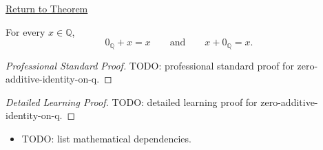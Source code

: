 \newpage
{}
\label{prf:zero-additive-identity-on-q}

\begin{remark*}[Return]
\hyperref[thm:zero-additive-identity-on-q]{Return to Theorem}
\end{remark*}

\begin{theorem*}
For every $x\in\mathbb{Q}$,
\[
0_{\mathbb{Q}}+x=x
\qquad\text{and}\qquad
x+0_{\mathbb{Q}}=x.
\]
\end{theorem*}

\begin{proof}[Professional Standard Proof]
\LRAProofBodyStart
TODO: professional standard proof for zero-additive-identity-on-q.
\end{proof}

\begin{proof}[Detailed Learning Proof]
\LRAProofBodyStart
TODO: detailed learning proof for zero-additive-identity-on-q.
\end{proof}

\begin{remark*}
\end{remark*}

\begin{dependencies}
\begin{itemize}
  \item TODO: list mathematical dependencies.
\end{itemize}
\end{dependencies}

\clearpage

